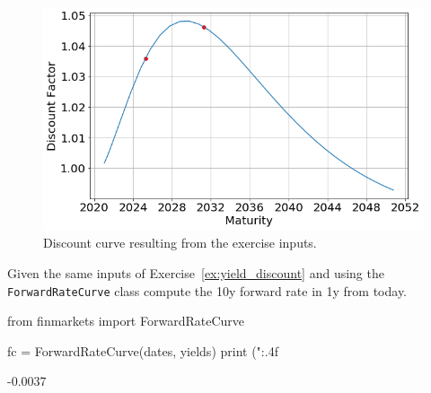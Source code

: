 \begin{solution}
\begin{figure}[htpb]
\centering
\includegraphics[width=0.7\linewidth]{figures/ex_discount}
\caption{Discount curve resulting from the exercise inputs.}
\label{fig:ex_discount}
\end{figure}
\end{solution}

%
%


\begin{question}
Given the same inputs of Exercise~\ref{ex:yield_discount} and using the \texttt{ForwardRateCurve} class compute the 10y forward rate in 1y from today. 
\end{question}

\cprotEnv\begin{solution}
\begin{ipython}
from finmarkets import ForwardRateCurve

fc = ForwardRateCurve(dates, yields)
print ("{:.4f}%
\end{ipython}
\begin{ioutput}
-0.0037%
\end{ioutput}
\end{solution}

